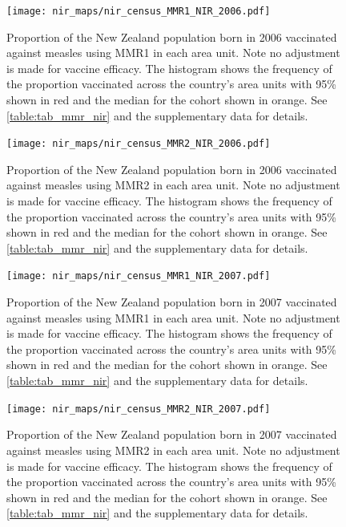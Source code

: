 \documentclass{article}
\begin{document}
\begin{figure}
   \begin{center}
    \texttt{[image: nir\_maps/nir\_census\_MMR1\_NIR\_2006.pdf]}
    \end{center}
    \caption{Proportion of the New Zealand population born in 2006 vaccinated against measles using MMR1 in each area unit. Note no adjustment is made for vaccine efficacy. The histogram shows the frequency of the proportion vaccinated across the country's area units with 95\% shown in red and the median for the cohort shown in orange. See \autoref{table:tab_mmr_nir} and the supplementary data for details.}
\label{fig:fig12006}
\end{figure}


\begin{figure}
\begin{center}
\texttt{[image: nir\_maps/nir\_census\_MMR2\_NIR\_2006.pdf]}
\end{center}
    \caption{Proportion of the New Zealand population born in 2006 vaccinated against measles using MMR2 in each area unit. Note no adjustment is made for vaccine efficacy. The histogram shows the frequency of the proportion vaccinated across the country's area units with 95\% shown in red and the median for the cohort shown in orange. See \autoref{table:tab_mmr_nir} and the supplementary data for details.}
\label{fig:fig22006}
\end{figure}


\begin{figure}
\begin{center}
\texttt{[image: nir\_maps/nir\_census\_MMR1\_NIR\_2007.pdf]}
\end{center}
    \caption{Proportion of the New Zealand population born in 2007 vaccinated against measles using MMR1 in each area unit. Note no adjustment is made for vaccine efficacy. The histogram shows the frequency of the proportion vaccinated across the country's area units with 95\% shown in red and the median for the cohort shown in orange. See \autoref{table:tab_mmr_nir} and the supplementary data for details.}
\label{fig:fig12007}
\end{figure}


\begin{figure}
\begin{center}
    \texttt{[image: nir\_maps/nir\_census\_MMR2\_NIR\_2007.pdf]}
\end{center}
    \caption{Proportion of the New Zealand population born in 2007 vaccinated against measles using MMR2 in each area unit. Note no adjustment is made for vaccine efficacy. The histogram shows the frequency of the proportion vaccinated across the country's area units with 95\% shown in red and the median for the cohort shown in orange. See \autoref{table:tab_mmr_nir} and the supplementary data for details.}
\label{fig:fig22007}
\end{figure}
\end{document}
